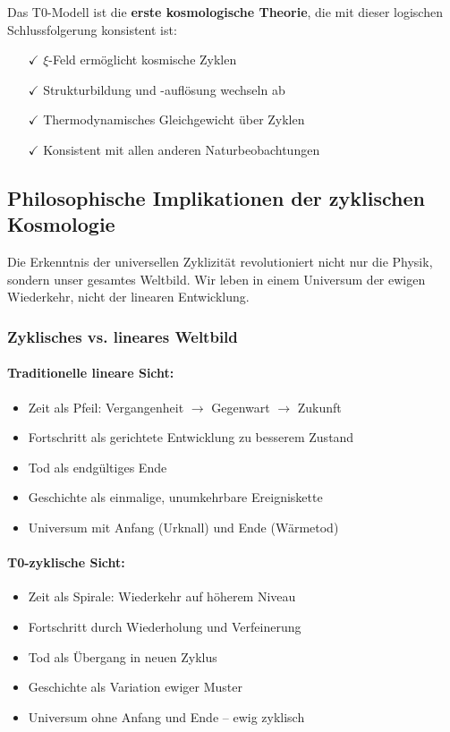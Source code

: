 \documentclass[12pt,a4paper]{article}
\theoremstyle{definition}
\begin{document}
	Das T0-Modell ist die \textbf{erste kosmologische Theorie}, die mit dieser logischen Schlussfolgerung konsistent ist:
	\begin{itemize}
		\item[$\checkmark$] $\xi$-Feld ermöglicht kosmische Zyklen
		\item[$\checkmark$] Strukturbildung und -auflösung wechseln ab
		\item[$\checkmark$] Thermodynamisches Gleichgewicht über Zyklen
		\item[$\checkmark$] Konsistent mit allen anderen Naturbeobachtungen
	\end{itemize}
	
	\subsection{Philosophische Implikationen der zyklischen Kosmologie}
	
	\begin{revolutionary}
		Die Erkenntnis der universellen Zyklizität revolutioniert nicht nur die Physik, sondern unser gesamtes Weltbild. Wir leben in einem Universum der ewigen Wiederkehr, nicht der linearen Entwicklung.
	\end{revolutionary}
	
	\subsubsection{Zyklisches vs. lineares Weltbild}
	
	\paragraph{Traditionelle lineare Sicht:}
	\begin{itemize}
		\item Zeit als Pfeil: Vergangenheit $\to$ Gegenwart $\to$ Zukunft
		\item Fortschritt als gerichtete Entwicklung zu besserem Zustand
		\item Tod als endgültiges Ende
		\item Geschichte als einmalige, unumkehrbare Ereigniskette
		\item Universum mit Anfang (Urknall) und Ende (Wärmetod)
	\end{itemize}
	
	\paragraph{T0-zyklische Sicht:}
	\begin{itemize}
		\item Zeit als Spirale: Wiederkehr auf höherem Niveau
		\item Fortschritt durch Wiederholung und Verfeinerung
		\item Tod als Übergang in neuen Zyklus
		\item Geschichte als Variation ewiger Muster
		\item Universum ohne Anfang und Ende -- ewig zyklisch
	\end{itemize}
	
\end{document}
